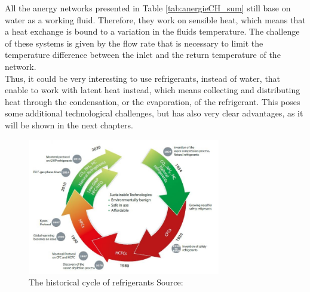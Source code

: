 \documentclass{article}
\begin{document}


All the anergy networks presented in Table \ref{tab:anergieCH_sum} still base on water as a working fluid. Therefore, they work on sensible heat, which means that a heat exchange is bound to a variation in the fluids temperature. The challenge of these systems is given by the flow rate that is necessary to limit the temperature difference between the inlet and the return temperature of the network.\\
Thus, it could be very interesting to use refrigerants, instead of water, that enable to work with latent heat instead, which means collecting and distributing heat through the condensation, or the evaporation, of the refrigerant. This poses some additional technological challenges, but has also very clear advantages, as it will be shown in the next chapters.\\


\begin{figure}[h!]
\centering
\includegraphics[width=0.75\textwidth]{refrigerants.JPG}
\caption{The historical cycle of refrigerants Source: \cite{danfossRefrigerantOptionsNow2017}}
\label{fig:refrigerants}
\end{figure}
\end{document}
